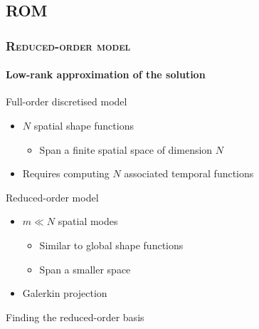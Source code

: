 \documentclass[aspectratio=1610]{beamer}
\begin{document}
	\subsection{ROM}
	\begin{frame}
		\frametitle{\textsc{Reduced-order model}}
		\framesubtitle{Low-rank approximation of the solution }
		\begin{minipage}{0.48\linewidth}
			\begin{greenblockshadow}{Full-order discretised model}
				\begin{itemize}
					\item $N$ spatial shape functions
					\begin{itemize}
						\item Span a finite spatial space of dimension $N$
					\end{itemize}
					\item Requires computing $N$ associated temporal functions
				\end{itemize}
			\end{greenblockshadow}
		\end{minipage}
		\hfill
		\begin{minipage}{0.48\linewidth}
			\begin{greenblockshadow}{Reduced-order model}
				\begin{itemize}
					\item $m \ll N$ spatial modes
					\begin{itemize}
						\item Similar to global shape functions
						\item[\faLightbulb] Span a smaller space
					\end{itemize}
					\item[\faCogs] Galerkin projection 
				\end{itemize}
				\vspace{1pt}
			\end{greenblockshadow}
		\end{minipage}
		\vfill
		\begin{orangeblockshadow}{\faCogs \quad Finding the reduced-order basis}
			

\end{orangeblockshadow}
\end{frame}
\end{document}
